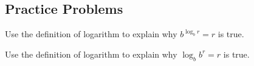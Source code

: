 \documentclass[10pt,]{book}
\theoremstyle{ptxdefinitionnotitle}
\theoremstyle{ptxdefinitiontitle}
\theoremstyle{ptxdefinitionnotitle}
\theoremstyle{ptxdefinitiontitle}
\theoremstyle{ptxdefinitionnotitle}
\theoremstyle{ptxdefinitiontitle}
\numberwithin{equation}{section}
\begin{document}
\subsection[{Practice Problems}]{Practice Problems}\label{exercises-11}
\begin{divisionexercise}{1}\hypertarget{exercise-73}{}
\hypertarget{p-297}{}%
Use the definition of logarithm to explain why \(b^{\log_b r} = r\) is true.%
\end{divisionexercise}%
\begin{divisionexercise}{2}\hypertarget{exercise-74}{}
\hypertarget{p-298}{}%
Use the definition of logarithm to explain why \(\log_b b^r = r\) is true.%
\end{divisionexercise}%
\typeout{************************************************}
\typeout{************************************************}
\end{document}
